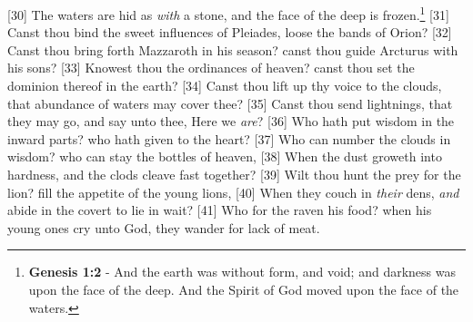 [30] \textcolor[cmyk]{0.99998,1,0,0}{The waters are hid as \emph{with} a stone, and the face of the deep is frozen.}\footnote{\textbf{Genesis 1:2} - And the earth was without form, and void; and darkness was upon the face of the deep. And the Spirit of God moved upon the face of the waters.}
[31] \textcolor[cmyk]{0.99998,1,0,0}{Canst thou bind the sweet influences of Pleiades,  loose the bands of Orion?}
[32] \textcolor[cmyk]{0.99998,1,0,0}{Canst thou bring forth Mazzaroth in his season?  canst thou guide Arcturus with his sons?}
[33] \textcolor[cmyk]{0.99998,1,0,0}{Knowest thou the ordinances of heaven? canst thou set the dominion thereof in the earth?}
[34] \textcolor[cmyk]{0.99998,1,0,0}{Canst thou lift up thy voice to the clouds, that abundance of waters may cover thee?}
[35] \textcolor[cmyk]{0.99998,1,0,0}{Canst thou send lightnings, that they may go, and say unto thee, Here we \emph{are}?}
[36] \textcolor[cmyk]{0.99998,1,0,0}{Who hath put wisdom in the inward parts?  who hath given  to the heart?}
[37] \textcolor[cmyk]{0.99998,1,0,0}{Who can number the clouds in wisdom?  who can stay the bottles of heaven,}
[38] \textcolor[cmyk]{0.99998,1,0,0}{When the dust groweth into hardness, and the clods cleave fast together?}
[39] \textcolor[cmyk]{0.99998,1,0,0}{Wilt thou hunt the prey for the lion?  fill the appetite of the young lions,}
[40] \textcolor[cmyk]{0.99998,1,0,0}{When they couch in \emph{their} dens, \emph{and} abide in the covert to lie in wait?}
[41] \textcolor[cmyk]{0.99998,1,0,0}{Who  for the raven his food? when his young ones cry unto God, they wander for lack of meat.}